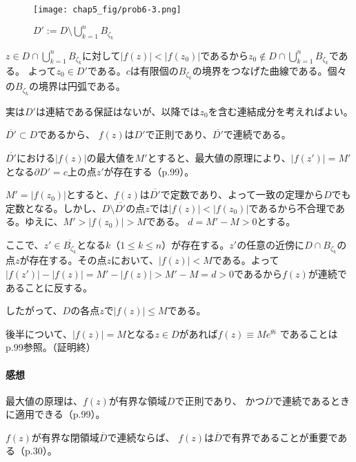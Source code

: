\begin{figure}[h]
    \centering
    \texttt{[image: chap5\_fig/prob6-3.png]}
    \caption{$D':=D\setminus\bigcup_{k=1}^{n}B_{\zeta_k}$}
    \label{fig:chap5-6-3}
\end{figure}

$z\in D\cap \bigcup_{k=1}^{n}B_{\zeta_k}$に対して$|f(z)|<|f(z_0)|$であるから$z_0\not\in D\cap \bigcup_{k=1}^{n}B_{\zeta_k}$である。
よって$z_0\in D'$である。$c$は有限個の$B_{\zeta_k}$の境界をつなげた曲線である。個々の$B_{\zeta_k}$の境界は円弧である。

実は$D'$は連結である保証はないが、以降では$z_0$を含む連結成分を考えればよい。

$\overline{D'}\subset D$であるから、
$f(z)$は$D'$で正則であり、$\overline{D'}$で連続である。

$\overline{D'}$における$|f(z)|$の最大値を$M'$とすると、最大値の原理により、$|f(z')|=M'$となる$\partial D'=c$上の点$z'$が存在する（p.99）。

$M'=|f(z_0)|$とすると、$f(z)$は$\overline{D'}$で定数であり、よって一致の定理から$D$でも定数となる。しかし、$D\setminus\overline{D'}$の点$z$では$|f(z)|<|f(z_0)|$であるから不合理である。ゆえに、$M'>|f(z_0)|>M$である。
$d=M'-M>0$とする。

ここで、$z'\in\overline{B_{\zeta_k}}$となる$k$（$1\le k\le n$）が存在する。$z'$の任意の近傍に$D\cap B_{\zeta_k}$の点$z$が存在する。その点$z$において、$|f(z)|<M$である。よって$|f(z')|-|f(z)|=M'-|f(z)|>M'-M=d>0$であるから$f(z)$が連続であることに反する。

したがって、$D$の各点$z$で$|f(z)|\le M$である。



後半について、$|f(z)|=M$となる$z\in D$があれば$f(z)\equiv Me^{\theta i}$
であることはp.99参照。（証明終）

\paragraph{感想}
最大値の原理は、$f(z)$が有界な領域$D$で正則であり、
かつ$\overline{D}$で連続であるときに適用できる（p.99）。

$f(z)$が有界な閉領域$\overline{D}$で連続ならば、
$f(z)$は$\overline{D}$で有界であることが重要である（p.30）。


